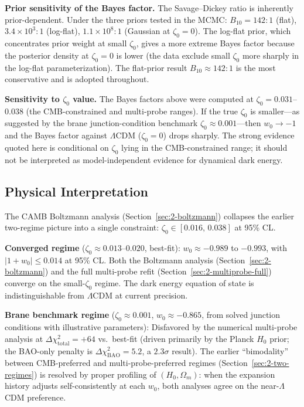 \textbf{Prior sensitivity of the Bayes factor.} The Savage--Dickey ratio is inherently prior-dependent. Under the three priors tested in the MCMC: $B_{10} = 142{:}1$ (flat), $3.4 \times 10^3{:}1$ (log-flat), $1.1 \times 10^8{:}1$ (Gaussian at $\zeta_0 = 0$). The log-flat prior, which concentrates prior weight at small $\zeta_0$, gives a more extreme Bayes factor because the posterior density at $\zeta_0 = 0$ is lower (the data exclude small $\zeta_0$ more sharply in the log-flat parameterization). The flat-prior result $B_{10} \approx 142{:}1$ is the most conservative and is adopted throughout.

\textbf{Sensitivity to $\zeta_0$ value.} The Bayes factors above were computed at $\zeta_0 = 0.031$--$0.038$ (the CMB-constrained and multi-probe ranges). If the true $\zeta_0$ is smaller---as suggested by the brane junction-condition benchmark $\zeta_0 \approx 0.001$---then $w_0 \to -1$ and the Bayes factor against $\Lambda$CDM ($\zeta_0 = 0$) drops sharply. The strong evidence quoted here is conditional on $\zeta_0$ lying in the CMB-constrained range; it should not be interpreted as model-independent evidence for dynamical dark energy.

\subsection{Physical Interpretation}
\label{sec:2-interp}

The CAMB Boltzmann analysis (Section~\ref{sec:2-boltzmann}) collapses the earlier two-regime picture into a single constraint: $\zeta_0 \in [0.016,\,0.038]$ at 95\% CL.

\textbf{Converged regime} ($\zeta_0 \approx 0.013$--$0.020$, best-fit): $w_0 \approx -0.989$ to $-0.993$, with $|1+w_0| \leq 0.014$ at 95\% CL. Both the Boltzmann analysis (Section~\ref{sec:2-boltzmann}) and the full multi-probe refit (Section~\ref{sec:2-multiprobe-full}) converge on the small-$\zeta_0$ regime. The dark energy equation of state is indistinguishable from $\Lambda$CDM at current precision.

\textbf{Brane benchmark regime} ($\zeta_0 \approx 0.001$, $w_0 \approx -0.865$, from solved junction conditions with illustrative parameters): Disfavored by the numerical multi-probe analysis at $\Delta\chi^2_\mathrm{total} = +64$ vs.\ best-fit (driven primarily by the Planck $H_0$ prior; the BAO-only penalty is $\Delta\chi^2_\mathrm{BAO} = 5.2$, a $2.3\sigma$ result). The earlier ``bimodality'' between CMB-preferred and multi-probe-preferred regimes (Section~\ref{sec:2-two-regimes}) is resolved by proper profiling of $(H_0, \Omega_m)$: when the expansion history adjusts self-consistently at each $w_0$, both analyses agree on the near-$\Lambda$CDM preference.

